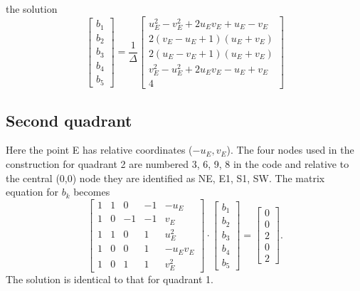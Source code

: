 \documentclass[12pt,letterpaper,margin=0.5in]{report}
\begin{document}
the solution
\begin{equation}
\left[ {\begin{array}{*{20}{c}}
{{b_1}}\\
{{b_2}}\\
{{b_3}}\\
{{b_4}}\\
{{b_5}}
\end{array}} \right] = \frac{1}{\Delta }\left[ {\begin{array}{*{20}{c}}
{u_E^2 - v_E^2 + 2{u_E}{v_E} + {u_E} - {v_E}}\\[4pt]
{2\left( {{v_E} - {u_E} + 1} \right)\left( {{u_E} + {v_E}} \right)}\\[4pt]
{2\left( {{u_E} - {v_E} + 1} \right)\left( {{u_E} + {v_E}} \right)}\\[4pt]
{v_E^2 - u_E^2 + 2{u_E}{v_E} - {u_E} + {v_E}}\\[4pt]
4
\end{array}} \right]
\end{equation}
\subsection{Second quadrant}
Here the point E has relative coordinates ($-u_E, v_E$).  The four nodes used in the
construction for quadrant 2 are numbered 3, 6, 9, 8 in the code and relative to the central (0,0) node they
are identified as NE, E1, S1, SW. The matrix equation for $b_k$ becomes
\begin{equation}
\left[ {\begin{array}{*{20}{r}}
1&1&0&{ - 1}&{ - {u_E}}\\
1&0&{ - 1}&{ - 1}&{{v_E}}\\
1&1&0&1&{u_E^2}\\
1&0&0&1&{ - {u_E}{v_E}}\\
1&0&1&1&{v_E^2}
\end{array}} \right] \cdot \left[ {\begin{array}{*{20}{c}}
{{b_1}}\\
{{b_2}}\\
{{b_3}}\\
{{b_4}}\\
{{b_5}}
\end{array}} \right] = \left[ {\begin{array}{*{20}{c}}
0\\
0\\
2\\
0\\
2
\end{array}} \right].
\label{eq:upper}
\end{equation}
The solution is identical to that for quadrant 1.
\end{document}
